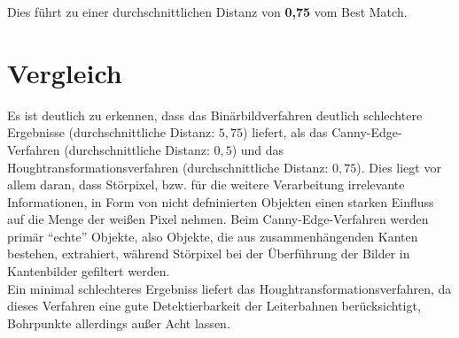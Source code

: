 Dies führt zu einer durchschnittlichen Distanz von \textbf{0,75} vom Best Match.

\section{Vergleich}
Es ist deutlich zu erkennen, dass das Binärbildverfahren deutlich schlechtere Ergebnisse (durchschnittliche Distanz: $5,75$) liefert, als das Canny-Edge-Verfahren (durchschnittliche Distanz: $0,5$) und das Houghtransformationsverfahren (durchschnittliche Distanz: $0,75$). Dies liegt vor allem daran, dass Störpixel, bzw. für die weitere Verarbeitung irrelevante Informationen, in Form von nicht defninierten Objekten einen starken Einfluss auf die Menge der weißen Pixel nehmen. Beim Canny-Edge-Verfahren werden primär "`echte"' Objekte, also Objekte, die aus zusammenhängenden Kanten bestehen, extrahiert, während Störpixel bei der Überführung der Bilder in Kantenbilder gefiltert werden. \\
Ein minimal schlechteres Ergebniss liefert das Houghtransformationsverfahren, da dieses Verfahren eine gute Detektierbarkeit der Leiterbahnen berücksichtigt, Bohrpunkte allerdings außer Acht lassen.


